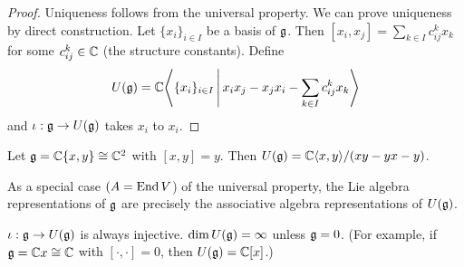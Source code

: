 \begin{proof}
  Uniqueness follows from the universal property.
  We can prove uniqueness by direct construction.
  Let $\{x_i\}_{i \in I}$ be a basis of $\mathfrak{g}$.
  Then $[x_i,x_j] = \sum_{k \in I} c_{ij}^k x_k$ for some $c_{ij}^k \in \mathbb{C}$ (the structure constants).
  Define
  \[ U(\mathfrak{g}) = \mathbb{C}{\left\langle \{x_i\}_{i \in I} \, \Bigg\vert \, x_ix_j-x_jx_i-\sum_{k \in I} c_{ij}^k x_k \right\rangle} \]
  and $\iota: \mathfrak{g} \to U(\mathfrak{g})$ takes $x_i$ to $x_i$.
\end{proof}

\begin{exam}
  Let $\mathfrak{g} = \mathbb{C}\{x,y\} \cong \mathbb{C}^2$ with $[x,y]=y$.
  Then $U(\mathfrak{g}) = \mathbb{C}{\left\langle x,y \right\rangle}/(xy-yx-y)$.
\end{exam}

\begin{rmk}
  As a special case $(A=\operatorname{End} V$) of the universal property, the Lie algebra representations of $\mathfrak{g}$ are precisely the associative algebra representations of $U(\mathfrak{g})$.
\end{rmk}

\begin{rmk}
  \lv
  \begin{enum}
    \io $\iota: \mathfrak{g} \to U(\mathfrak{g})$ is always injective.
    \io $\dim U(\mathfrak{g})=\infty$ unless $\mathfrak{g}=0$.
    (For example, if $\mathfrak{g} = \mathbb{C} x \cong \mathbb{C}$ with $[\cdot,\cdot]=0$, then $U(\mathfrak{g})=\mathbb{C}[x]$.)
  \end{enum}
\end{rmk}

